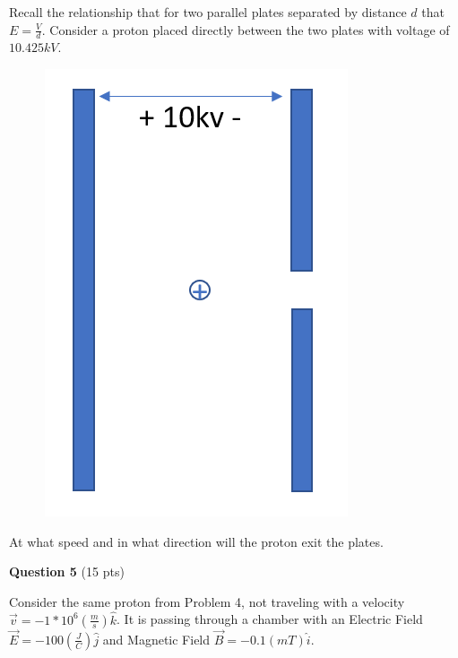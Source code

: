 \documentclass[14pt]{report}
\begin{document}
Recall the relationship that for two parallel plates separated by distance $d$ that $E = \frac{V}{d}$. Consider a proton placed directly between the two plates with voltage of $10.425 kV$. 

\begin{figure}[H]
\begin{center}
\includegraphics[scale=0.25]{final_4a.png}
\end{center}
\end{figure}

At what speed and in what direction will the proton exit the plates. 

\textbf{Question 5} (15 pts)

Consider the same proton from Problem 4, not traveling with a velocity $\vec{v} = -1*10^6 (\frac{m}{s}) \hat{k}$. It is passing through a chamber with an Electric Field $\vec{E} = -100 (\frac{J}{C}) \hat{j}$ and Magnetic Field $\vec{B} = -0.1 (mT) \hat{i}$.
\end{document}
